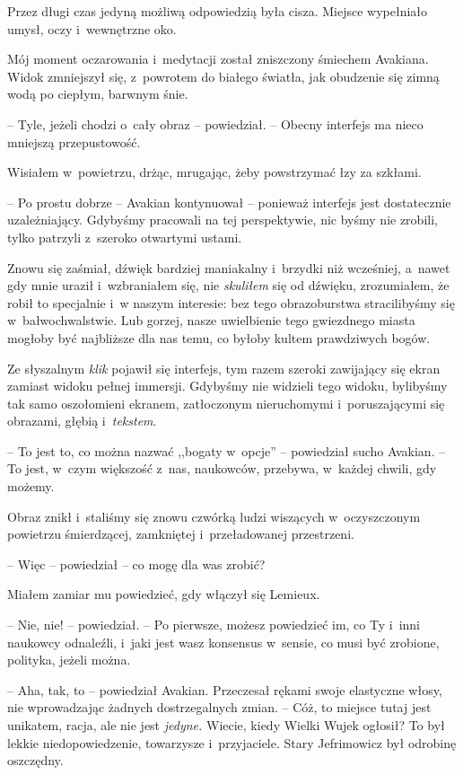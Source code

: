 \documentclass[oneside,polish,12pt,sfheadings]{mwbk}
\begin{document}
Przez długi czas jedyną możliwą odpowiedzią była cisza. Miejsce
wypełniało umysł, oczy i~wewnętrzne oko.

Mój moment oczarowania i~medytacji został zniszczony śmiechem Avakiana.
Widok zmniejszył się, z~powrotem do białego światła, jak obudzenie się
zimną wodą po ciepłym, barwnym śnie.

-- Tyle, jeżeli chodzi o~cały obraz -- powiedział. -- Obecny interfejs ma
nieco mniejszą przepustowość.

Wisiałem w~powietrzu, drżąc, mrugając, żeby powstrzymać łzy za szkłami.

-- Po prostu dobrze -- Avakian kontynuował -- ponieważ interfejs jest
dostatecznie uzależniający. Gdybyśmy pracowali na tej perspektywie, nic
byśmy nie zrobili, tylko patrzyli z~szeroko otwartymi ustami.

Znowu się zaśmiał, dźwięk bardziej maniakalny i~brzydki niż wcześniej, a~nawet gdy mnie uraził i~wzbraniałem się, nie \emph{skuliłem} się od
dźwięku, zrozumiałem, że robił to specjalnie i~w naszym interesie: bez
tego obrazoburstwa stracilibyśmy się w~bałwochwalstwie. Lub gorzej,
nasze uwielbienie tego gwiezdnego miasta mogłoby być najbliższe dla nas
temu, co byłoby kultem prawdziwych bogów.

Ze słyszalnym \emph{klik} pojawił się interfejs, tym razem szeroki
zawijający się ekran zamiast widoku pełnej immersji. Gdybyśmy nie
widzieli tego widoku, bylibyśmy tak samo oszołomieni ekranem,
zatłoczonym nieruchomymi i~poruszającymi się obrazami, głębią i~\emph{tekstem}.

-- To jest to, co można nazwać ,,bogaty w~opcje'' -- powiedział sucho
Avakian. -- To jest, w~czym większość z~nas, naukowców, przebywa, w~każdej chwili, gdy możemy.

Obraz znikł i~staliśmy się znowu czwórką ludzi wiszących w~oczyszczonym
powietrzu śmierdzącej, zamkniętej i~przeładowanej przestrzeni.

-- Więc -- powiedział -- co mogę dla was zrobić?

Miałem zamiar mu powiedzieć, gdy włączył się Lemieux.

-- Nie, nie! -- powiedział. -- Po pierwsze, możesz powiedzieć im, co Ty i~inni naukowcy odnaleźli, i~jaki jest wasz konsensus w~sensie, co musi
być zrobione, polityka, jeżeli można.

-- Aha, tak, to -- powiedział Avakian. Przeczesał rękami swoje elastyczne
włosy, nie wprowadzając żadnych dostrzegalnych zmian. -- Cóż, to miejsce
tutaj jest unikatem, racja, ale nie jest \emph{jedyne.} Wiecie, kiedy
Wielki Wujek ogłosił? To był lekkie niedopowiedzenie, towarzysze i~przyjaciele. Stary Jefrimowicz był odrobinę oszczędny.
\end{document}
